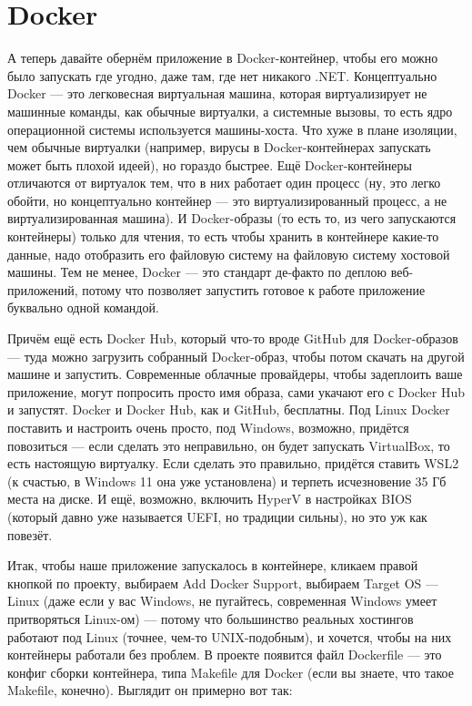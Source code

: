\documentclass[a5paper]{article}
\begin{document}
\section{Docker}

А теперь давайте обернём приложение в Docker-контейнер, чтобы его можно было запускать где угодно, даже там, где нет никакого .NET. Концептуально Docker --- это легковесная виртуальная машина, которая виртуализирует не машинные команды, как обычные виртуалки, а системные вызовы, то есть ядро операционной системы используется машины-хоста. Что хуже в плане изоляции, чем обычные виртуалки (например, вирусы в Docker-контейнерах запускать может быть плохой идеей), но гораздо быстрее. Ещё Docker-контейнеры отличаются от виртуалок тем, что в них работает один процесс (ну, это легко обойти, но концептуально контейнер --- это виртуализированный процесс, а не виртуализированная машина). И Docker-образы (то есть то, из чего запускаются контейнеры) только для чтения, то есть чтобы хранить в контейнере какие-то данные, надо отобразить его файловую систему на файловую систему хостовой машины. Тем не менее, Docker --- это стандарт де-факто по деплою веб-приложений, потому что позволяет запустить готовое к работе приложение буквально одной командой. 

Причём ещё есть Docker Hub, который что-то вроде GitHub для Docker-образов --- туда можно загрузить собранный Docker-образ, чтобы потом скачать на другой машине и запустить. Современные облачные провайдеры, чтобы задеплоить ваше приложение, могут попросить просто имя образа, сами укачают его с Docker Hub и запустят. Docker и Docker Hub, как и GitHub, бесплатны. Под Linux Docker поставить и настроить очень просто, под Windows, возможно, придётся повозиться --- если сделать это неправильно, он будет запускать VirtualBox, то есть настоящую виртуалку. Если сделать это правильно, придётся ставить WSL2 (к счастью, в Windows 11 она уже установлена) и терпеть исчезновение 35 Гб места на диске. И ещё, возможно, включить HyperV в настройках BIOS (который давно уже называется UEFI, но традиции сильны), но это уж как повезёт.

Итак, чтобы наше приложение запускалось в контейнере, кликаем правой кнопкой по проекту, выбираем Add Docker Support, выбираем Target OS --- Linux (даже если у вас Windows, не пугайтесь, современная Windows умеет притворяться Linux-ом) --- потому что большинство реальных хостингов работают под Linux (точнее, чем-то UNIX-подобным), и хочется, чтобы на них контейнеры работали без проблем. В проекте появится файл Dockerfile --- это конфиг сборки контейнера, типа Makefile для Docker (если вы знаете, что такое Makefile, конечно). Выглядит он примерно вот так:
\end{document}
